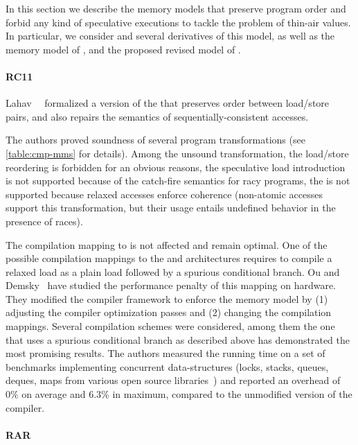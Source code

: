 In this section we describe the memory models 
that preserve program order and forbid any 
kind of speculative executions to tackle 
the problem of thin-air values. 
In particular, we consider \RCMM and 
several derivatives of this model, 
as well as the memory model of \OCaml, 
and the proposed revised model of \Java.  

\paragraph{RC11}

Lahav~\etal~\cite{Lahav-al:PLDI17} formalized 
a version of the \CMM that preserves order between load/store pairs, 
and also repairs the semantics of sequentially-consistent accesses.

The authors proved soundness of several program transformations 
(see \cref{table:cmp-mms} for details). 
Among the unsound transformation, 
the load/store reordering is forbidden for an obvious reasons, 
the speculative load introduction is not supported 
because of the catch-fire semantics for racy programs, 
the \CSE is not supported because relaxed accesses 
enforce coherence (non-atomic accesses 
support this transformation, but their usage entails 
undefined behavior in the presence of races).

The compilation mapping to \Intel is not affected and remain optimal.
One of the possible compilation mappings 
to the \ARM and \POWER architectures 
requires to compile a relaxed load as  
a plain load followed by a spurious conditional branch.
Ou and Demsky~\cite{Ou-Demsky:OOPSLA18} have studied 
the performance penalty of this mapping on  hardware.
They modified the \LLVM compiler framework 
to enforce the \RCMM memory model
by (1) adjusting the compiler optimization passes and 
(2) changing the compilation mappings.
Several compilation schemes were considered,
among them the one that uses a spurious conditional branch
as described above has demonstrated the most promising results.  
The authors measured the running time on a set of benchmarks 
implementing concurrent data-structures
(\eg locks, stacks, queues, deques, maps
from various open source libraries~\cite{CDSLib, FollyLib, JunctionLib})
and reported an overhead of 0\% on average and 6.3\% in maximum,
compared to the unmodified version of the compiler. 

\paragraph{RAR}

